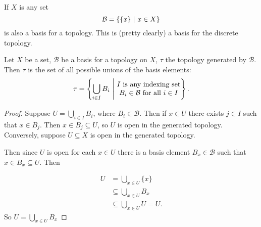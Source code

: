 \documentclass[12pt, twosided]{article}
\begin{document}
\begin{exa}
  If \(X\) is any set \[\mathcal{B} = \opn \opn x \cls\ \middle\vert\ x \in X \cls\] is also a basis for a topology. This is (pretty clearly) a basis for the discrete topology.
\end{exa}

\begin{lm}
  Let \(X\) be a set, \(\mathcal{B}\) be a basis for a topology on \(X\), \(\tau\) the topology generated by \(\mathcal{B}\). Then \(\tau\) is the set of all possible unions of the basis elements:
  \begin{align*}
    \tau = \left\{ \bigcup_{i \in I} B_i\ \middle\vert\ \begin{matrix} I \text{ is any indexing set} \\ B_i \in \mathcal{B} \text{ for all } i \in I \end{matrix} \right\}.
  \end{align*}
\end{lm}
\begin{proof}
  Suppose \(U = \bigcup_{i \in I} B_i\), where \(B_i \in \mathcal{B}\). Then if \(x \in U\) there exists \(j \in I\) such that \(x \in B_j\). Then \(x \in B_j \subseteq U\), so \(U\) is open in the generated topology. Conversely, suppose \(U \subseteq X\) is open in the generated topology.

  Then since \(U\) is open for each \(x \in U\) there is a basis element \(B_x \in \mathcal{B}\) such that \(x \in B_x \subseteq U\). Then

  \begin{align*}
    U &= \bigcup_{x \in U} \{x\} \\
      &\subseteq \bigcup_{x \in U} B_x \\
      &\subseteq \bigcup_{x \in U} U = U.
  \end{align*}
  So \(U = \bigcup_{x \in U} B_x\)
\end{proof}
\end{document}
